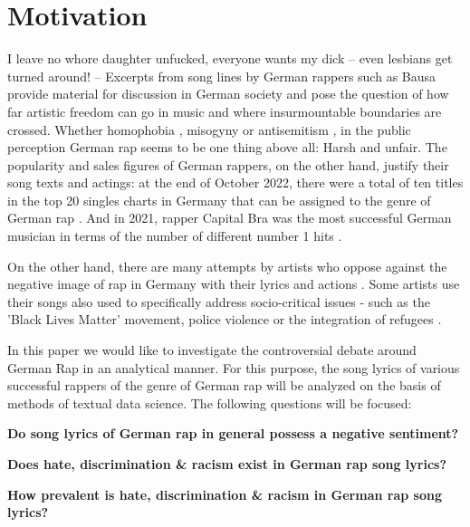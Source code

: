 \section{Motivation}
I leave no whore daughter unfucked, everyone wants my dick -- even lesbians get turned around! -- Excerpts from song lines by German rappers such as Bausa \cite{steffes-lay_2019} provide material for discussion in German society and pose the question of how far artistic freedom can go in music and where insurmountable boundaries are crossed. Whether homophobia \cite{steffes-lay_2019}, misogyny \cite{steffes-lay_2019} or antisemitism \cite{salomo_greven_2021}, in the public perception German rap seems to be one thing above all: Harsh and unfair. The popularity and sales figures of German rappers, on the other hand, justify their song texts and actings: at the end of October 2022, there were a total of ten titles in the top 20 singles charts in Germany that can be assigned to the genre of German rap \cite{mtv_germany_2022}. And in 2021, rapper Capital Bra was the most successful German musician in terms of the number of different number 1 hits \cite{br_2019}. 

On the other hand, there are many attempts by artists who oppose against the negative image of rap in Germany with their lyrics and actions \cite{Deutschlandfunk_2021}. Some artists use their songs also used to specifically address socio-critical issues - such as the 'Black Lives Matter' movement, police violence or the integration of refugees \cite{me-redaktion_2021}.

In this paper we would like to investigate the controversial debate around German Rap in an analytical manner. For this purpose, the song lyrics of various successful rappers of the genre of German rap will be analyzed on the basis of methods of textual data science. The following questions will be focused:

\begin{questions}
    \item \textbf{Do song lyrics of German rap in general possess a negative sentiment?}
    \item \textbf{Does hate, discrimination \& racism exist in German rap song lyrics?}
    \item \textbf{How prevalent is hate, discrimination \& racism in German rap song lyrics?}
\end{questions}










